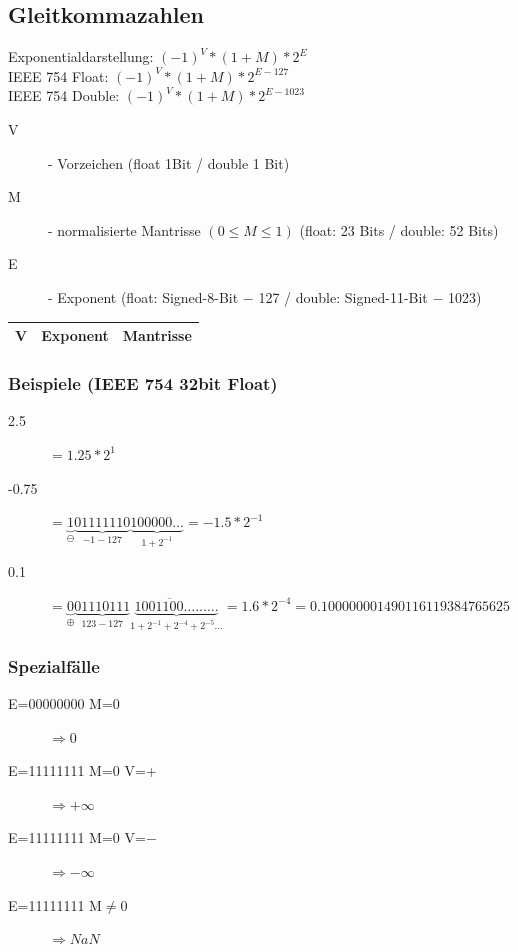 \documentclass[a4paper,10pt]{article}
\begin{document}
\subsection{Gleitkommazahlen}
Exponentialdarstellung: $(-1)^V * (1+M)*2^E$ \\
IEEE 754 Float: $(-1)^V * (1+M) * 2^{E-127}$ \\
IEEE 754 Double: $(-1)^V * (1+M) * 2^{E-1023}$ \\
\begin{description}
	\item[V] - Vorzeichen (float 1Bit / double 1 Bit)
	\item[M] - normalisierte Mantrisse $(0 \leq M \leq 1)$ (float: 23 Bits / double: 52 Bits)
	\item[E] - Exponent (float: Signed-8-Bit $-$ 127  / double: Signed-11-Bit $-$ 1023)
\end{description} 
\begin{tabular}{|c|l|l|}
	\hline
	V & Exponent & Mantrisse \\
	\hline
\end{tabular}

\subsubsection{Beispiele (IEEE 754 32bit Float)}
\begin{description}
	\item[2.5] $=1.25*2^1$
	\item[-0.75] $=\underbrace{1}_{\ominus}\underbrace{01111110}_{-1 - 127} \underbrace{100000...}_{1+2^{-1}}=-1.5*2^{-1}$
	\item[0.1] $=\underbrace{0}_{\oplus}\underbrace{01110111}_{123 - 127} \underbrace{100\overline{1100}.........}_{1+2^{-1}+2^{-4}+2^{-5}...}=1.6*2^{-4} = 0.100000001490116119384765625$ 
\end{description}

\subsubsection{Spezialf\"alle}
\begin{description}
	\item[E=00000000 M=0] $\Rightarrow 0$
	\item[E=11111111 M=0 V=+] $\Rightarrow +\infty$
	\item[E=11111111 M=0 V=$-$] $\Rightarrow -\infty$
	\item[E=11111111 M$\neq$0] $\Rightarrow NaN$
\end{description}
\end{document}
